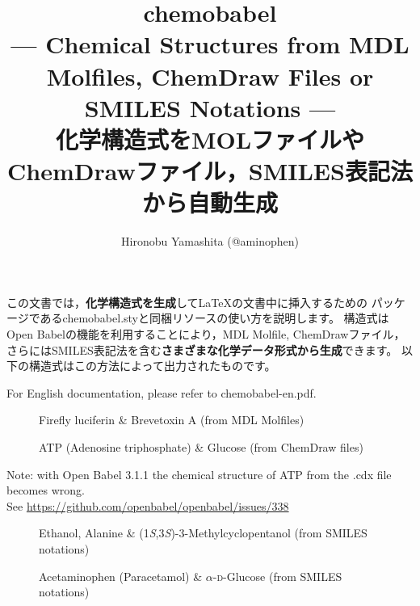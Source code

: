 \documentclass[12pt]{ltjsarticle}
\title{\textsf{chemobabel} \\[1ex]
  \normalsize --- Chemical Structures from MDL Molfiles,
  ChemDraw Files or SMILES Notations --- \\
  化学構造式をMOLファイルやChemDrawファイル，SMILES表記法から自動生成
  }
\author{Hironobu Yamashita (@aminophen)}
\begin{document}
\renewcommand{\figurename}{Fig.\,}
\maketitle

この文書では，\textbf{化学構造式を生成}して\LaTeX の文書中に挿入するための
パッケージである\textsf{chemobabel.sty}と同梱リソースの使い方を説明します。
構造式はOpen Babelの機能を利用することにより，MDL Molfile, ChemDrawファイル，
さらにはSMILES表記法を含む\textbf{さまざまな化学データ形式から生成}できます。
以下の構造式はこの方法によって出力されたものです。

For English documentation, please refer to chemobabel-en.pdf.

\begin{figure}[ht]
  \centering
   \quad
  \caption{Firefly luciferin \& Brevetoxin A (from MDL Molfiles)}
\end{figure}

\begin{figure}[ht]
  \centering
   \hspace{1cm}
  \caption{ATP (Adenosine triphosphate) \& Glucose (from ChemDraw files)}
\end{figure}
\begin{center}\small
Note: with Open Babel 3.1.1 the chemical structure of ATP from the .cdx file
becomes wrong.\\ See \url{https://github.com/openbabel/openbabel/issues/338}
\end{center}

\begin{figure}[ht]
  \centering
   \hspace{1cm}
   \hspace{1cm}
  \caption{Ethanol, Alanine \& (1\textit{S},3\textit{S})-3-Methylcyclopentanol (from SMILES notations)}
\end{figure}

\begin{figure}[ht]
  \centering
   \hspace{1cm}
  \caption{Acetaminophen (Paracetamol) \& $\alpha$-\textsc{d}-Glucose (from SMILES notations)}
\end{figure}
\end{document}
